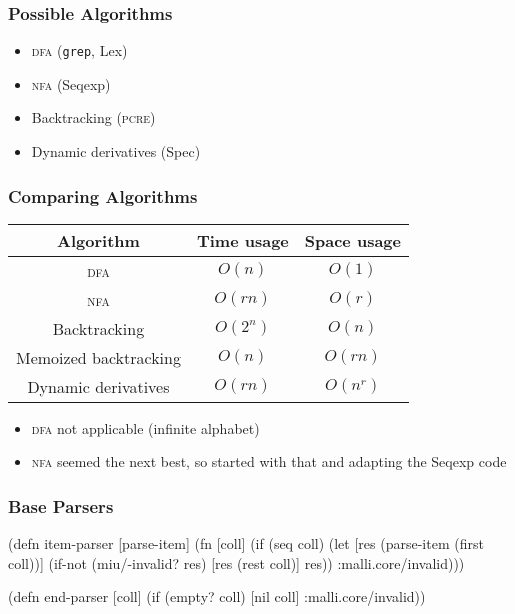 \documentclass{beamer}
\begin{document}

\begin{frame}
\frametitle{Possible Algorithms}

\begin{itemize}
\item \textsc{dfa} (\texttt{grep}, Lex)
\item \textsc{nfa} (Seqexp)
\item Backtracking (\textsc{pcre})
\item Dynamic derivatives (Spec)
\end{itemize}

\end{frame}


\begin{frame}
\frametitle{Comparing Algorithms}

\begin{center}
\begin{tabular}{c | c c}
Algorithm & Time usage & Space usage \\
\hline
\textsc{dfa} & \(O(n)\) & \(O(1)\) \\
\textsc{nfa} & \(O(rn)\) & \(O(r)\) \\
Backtracking & \(O(2^n)\) & \(O(n)\) \\
Memoized backtracking & \(O(n)\) & \(O(rn)\) \\
Dynamic derivatives & \(O(rn)\) & \(O(n^r)\)
\end{tabular}
\end{center}

\begin{itemize}
\item \textsc{dfa} not applicable (infinite alphabet)
\item \textsc{nfa} seemed the next best, so started with that and adapting the Seqexp code
\end{itemize}

\end{frame}


\begin{frame}[fragile]
\frametitle{Base Parsers}

\begin{semiverbatim}
(defn item-parser [parse-item]
  (fn [coll]
    (if (seq coll)
      (let [res (parse-item (first coll))]
        (if-not (miu/-invalid? res)
          [res (rest coll)]
          res))
      :malli.core/invalid)))
\end{semiverbatim}

\begin{semiverbatim}
(defn end-parser [coll]
  (if (empty? coll)
    [nil coll]
    :malli.core/invalid))
\end{semiverbatim}

\end{frame}
\end{document}
